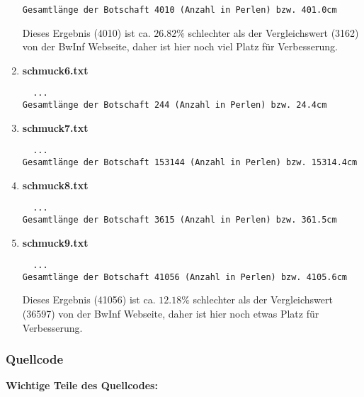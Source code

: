 \documentclass[a4paper,10pt,ngerman]{scrartcl}
\begin{document}
\begin{enumerate}
\begin{verbatim}
Gesamtlänge der Botschaft 4010 (Anzahl in Perlen) bzw. 401.0cm
\end{verbatim}

Dieses Ergebnis (4010) ist ca. $26.82\%$ schlechter als der Vergleichswert (3162) von der BwInf Webseite, daher ist hier noch viel Platz für Verbesserung.
  \item \textbf{schmuck6.txt}
\begin{verbatim}
  ...
Gesamtlänge der Botschaft 244 (Anzahl in Perlen) bzw. 24.4cm
\end{verbatim}
  \item \textbf{schmuck7.txt}
\begin{verbatim}
  ...
Gesamtlänge der Botschaft 153144 (Anzahl in Perlen) bzw. 15314.4cm
\end{verbatim}
  \item \textbf{schmuck8.txt}
\begin{verbatim}
  ...
Gesamtlänge der Botschaft 3615 (Anzahl in Perlen) bzw. 361.5cm
\end{verbatim}
  \item \textbf{schmuck9.txt}
\begin{verbatim}
  ...
Gesamtlänge der Botschaft 41056 (Anzahl in Perlen) bzw. 4105.6cm
\end{verbatim}
Dieses Ergebnis (41056) ist ca. $12.18\%$ schlechter als der Vergleichswert (36597) von der BwInf Webseite, daher ist hier noch etwas Platz für Verbesserung.
\end{enumerate}
\subsubsection{Quellcode}
\textbf{Wichtige Teile des Quellcodes:}\\
\end{document}
